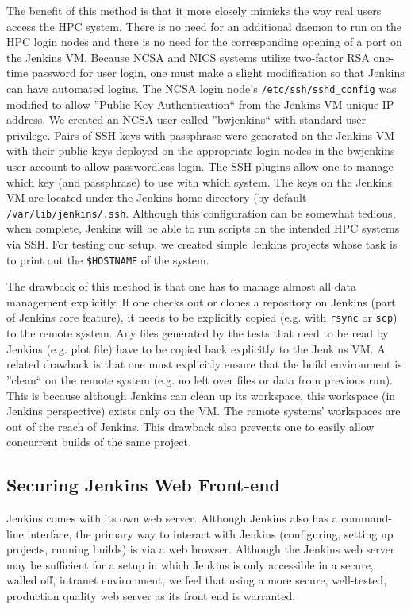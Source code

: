 \documentclass[10pt, conference, compsocconf]{IEEEtran}
\begin{document}
The benefit of this method is that it more closely mimicks the way real users access the HPC system. 
There is no need for an additional daemon to run on the HPC login nodes and there is no need for the corresponding opening of a port on the Jenkins VM. 
Because NCSA and NICS systems utilize two-factor RSA one-time password for user login, one must make a slight modification so that Jenkins can have automated logins. 
The NCSA login node's \texttt{/etc/ssh/sshd_config} was modified to allow ''Public Key Authentication`` from the Jenkins VM unique IP address. 
We created an NCSA user called ''bwjenkins`` with standard user privilege. 
Pairs of SSH keys with passphrase were generated on the Jenkins VM with their public keys deployed on the appropriate login nodes in the bwjenkins user account to allow passwordless login. 
The SSH plugins allow one to manage which key (and passphrase) to use with which system. 
The keys on the Jenkins VM are located under the Jenkins home directory (by default \texttt{/var/lib/jenkins/.ssh}. 
Although this configuration can be somewhat tedious, when complete, Jenkins will be able to run scripts on the intended HPC systems via SSH. 
For testing our setup, we created simple Jenkins projects whose task is to print out the \texttt{\$HOSTNAME} of the system.

The drawback of this method is that one has to manage almost all data management explicitly. 
If one checks out or clones a repository on Jenkins (part of Jenkins core feature), it needs to be explicitly copied (e.g. with \texttt{rsync} or \texttt{scp}) to the remote system. 
Any files generated by the tests that need to be read by Jenkins (e.g. plot file) have to be copied back explicitly to the Jenkins VM. 
A related drawback is that one must explicitly ensure that the build environment is ''clean`` on the remote system (e.g. no left over files or data from previous run). 
This is because although Jenkins can clean up its workspace, this workspace (in Jenkins perspective) exists only on the VM. 
The remote systems' workspaces are out of the reach of Jenkins. 
This drawback also prevents one to easily allow concurrent builds of the same project. 



\subsection{Securing Jenkins Web Front-end}

Jenkins comes with its own web server. 
Although Jenkins also has a command-line interface, the primary way to interact with Jenkins (configuring, setting up projects, running builds) is via a web browser. 
Although the Jenkins web server may be sufficient for a setup in which Jenkins is only accessible in a secure, walled off, intranet environment, we feel that using a more secure, well-tested, production quality web server as its front end is warranted.
\end{document}
